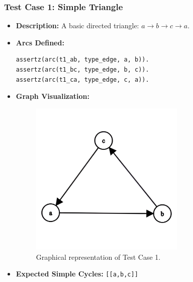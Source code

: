\documentclass[12pt,a4paper]{article}
\begin{document}
\subsubsection{Test Case 1: Simple Triangle}
\begin{itemize}
\item \textbf{Description:} A basic directed triangle: $a \rightarrow b \rightarrow c \rightarrow a$. 
\item \textbf{Arcs Defined:}
\begin{lstlisting}[style=prologstyle, basicstyle=\ttfamily\footnotesize]
assertz(arc(t1_ab, type_edge, a, b)).
assertz(arc(t1_bc, type_edge, b, c)).
assertz(arc(t1_ca, type_edge, c, a)).
\end{lstlisting}
\item \textbf{Graph Visualization:}
\begin{figure}[H]
\centering
\includegraphics[width=0.7\textwidth]{img/Test1.png} %
\caption{Graphical representation of Test Case 1.}
\label{fig:testcase1}
\end{figure}
\item \textbf{Expected Simple Cycles:} \texttt{[[a,b,c]]}
\end{itemize}
\end{document}
